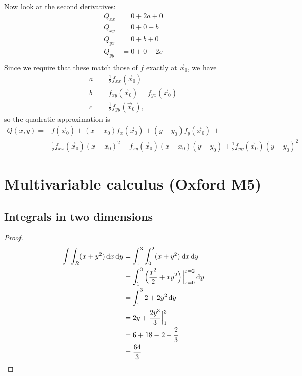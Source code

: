 Now look at the second derivatives:
\begin{align*}
  Q_{xx} &= 0 + 2a + 0 \\
  Q_{xy} &= 0 + 0 + b \\
  Q_{yx} &= 0 + b + 0 \\
  Q_{yy} &= 0 + 0 + 2c \\
\end{align*}
Since we require that these match those of $f$ exactly at $\vec x_0$, we have
\begin{align*}
  a &= \frac{1}{2} f_{xx}(\vec x_0) \\
  b &= f_{xy}(\vec x_0) = f_{yx}(\vec x_0) \\
  c &= \frac{1}{2} f_{yy}(\vec x_0),
\end{align*}
so the quadratic approximation is
\begin{align*}
Q(x, y) =
&f(\vec x_0) + (x - x_0)f_x(\vec x_0) +
(y - y_0)f_y(\vec x_0) ~+ \\
&\frac{1}{2} f_{xx}(\vec x_0)(x - x_0)^2 +
f_{xy}(\vec x_0)(x - x_0)(y - y_0) +
\frac{1}{2} f_{yy}(\vec x_0)(y - y_0)^2
\end{align*}

\section{Multivariable calculus (Oxford M5)}

\subsection{Integrals in two dimensions}

\begin{example*}[5]

\end{example*}

\begin{proof}
  \begin{align*}
    \int \int_R (x + y^2) \dx\dy
    &= \int_1^3 \int_0^2 (x + y^2) \dx\dy\\
    &= \int_1^3 \Big(\frac{x^2}{2} + xy^2\Big)\Big|_{x=0}^{x=2} \dy\\
    &= \int_1^3 2 + 2y^2 \dy\\
    &= 2y + \frac{2y^3}{3} \Big|_1^3\\
    &= 6 + 18 - 2 - \frac{2}{3}\\
    &= \frac{64}{3}
  \end{align*}
\end{proof}


